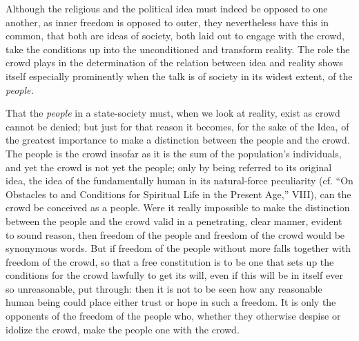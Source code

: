 \documentclass[12pt,a4paper,openany]{book}
\newcommand{\opage}[1]{\marginnote{\footnotesize\textit{[#1]}}}
\begin{document}
Although the religious and the political idea must indeed
be opposed to one another, as inner freedom is opposed
to outer, they nevertheless have this in common, that both are
ideas of society, both laid out to engage with
the crowd, take the conditions up into the unconditioned and transform
reality. The role the crowd plays in the
determination of the relation between idea and reality
shows itself especially prominently when the talk is of society
in its widest extent, of the \emph{people.}

That the \emph{people} in a state-society must, when we look at
reality, exist as crowd cannot be denied;
but just for that reason it becomes, for the sake of the Idea,
of the greatest importance to make a distinction between the people and
the crowd. The people is the crowd insofar as it is the sum
of the population's individuals, and yet the crowd is not yet
the people; only by being referred to its original idea,
the idea of the fundamentally human in its natural-force
\setcounter{footnote}{0}%
\opage{35}peculiarity (cf. ``On Obstacles to and Conditions for Spiritual Life in the Present Age,'' VIII), can the crowd be conceived
as a people. Were it really impossible to make the distinction between
the people and the crowd valid in a penetrating,
clear manner, evident to sound reason,
then freedom of the people and freedom of the crowd would be synonymous
words. But if freedom of the people without more falls together
with freedom of the crowd, so that a free constitution is to
be one that sets up the conditions for the crowd lawfully
to get its will, even if this will be in itself ever so
unreasonable, put through: then it is not to be seen how any reasonable human being
could place either trust or hope in such a
freedom. It is only the opponents of the freedom of the people who,
whether they otherwise despise or idolize the crowd,
make the people one with the crowd.
\end{document}

